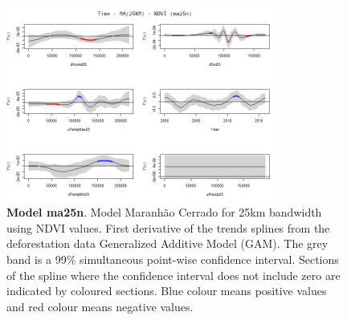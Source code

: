 \begin{table}
\begin{figure}[H]
 \centering
        \centering
        \includegraphics[width=0.8\textwidth]{ma25n.png} %
        \caption[Model Cerrado Maranhão for 25km bandwidth using NDVI values. First derivative of the trends splines from the deforestation data Generalized Additive Model (GAM)]{\textbf{Model ma25n}. Model Maranhão Cerrado for 25km bandwidth using NDVI values. First derivative of the trends splines from the deforestation data Generalized Additive Model (GAM). The grey band is a 99\% simultaneous point-wise confidence interval. Sections of the spline where the confidence interval does not include zero are indicated by coloured sections. Blue colour means positive values and red colour means negative values.}
\end{figure}
\end{table}

